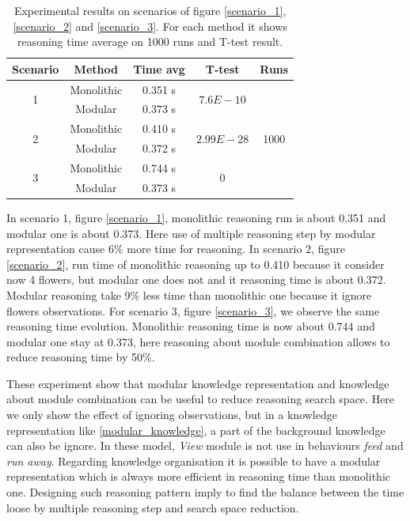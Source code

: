 \documentclass{aamas2012}
\begin{document}
	\begin{table}
		\label{Experiment_tab}
		\centering
		\begin{tabular}{ | c | c | c | c | c | }
		\hline
		Scenario & Method & Time avg & T-test & Runs\\	
		\hline
	 	\multirow{2}{*}{1} & Monolithic & 0.351 s & \multirow{2}{*}{$$7.6E-10$$} & \multirow{6}{*}{1000} \\
		& Modular & 0.373 s & & \\ \cline{1-4}
		\multirow{2}{*}{2} & Monolithic & 0.410 s & \multirow{2}{*}{$$2.99E-28$$} & \\
		& Modular & 0.372 s & & \\ \cline{1-4}
		\multirow{2}{*}{3} & Monolithic & 0.744 s & \multirow{2}{*}{0} &\\
		& Modular & 0.373 s & &\\
		\hline
		\end{tabular}
		\caption
		{
			Experimental results on scenarios of figure \ref{scenario_1}, \ref{scenario_2} and \ref{scenario_3}.
			For each method it shows reasoning time average on 1000 runs and T-test result.
		}
	\end{table}
	
	In scenario 1, figure \ref{scenario_1}, monolithic reasoning run is about 0.351 and modular one is about 0.373.
	Here use of multiple reasoning step by modular representation cause 6\% more time for reasoning.
	In scenario 2, figure \ref{scenario_2}, run time of monolithic reasoning up to 0.410 because it consider now 4 flowers, but
	modular one does not and it reasoning time is about 0.372.
	Modular reasoning take 9\% less time than monolithic one because it ignore flowers observations.
	For scenario 3, figure \ref{scenario_3}, we observe the same reasoning time evolution.
	Monolithic reasoning time is now about 0.744 and modular one stay at 0.373, here reasoning about module combination allows to reduce reasoning time by 50\%.
	
	These experiment show that modular knowledge representation and knowledge about module combination can be useful to reduce reasoning search space.
	Here we only show the effect of ignoring observations, but in a knowledge representation like \ref{modular_knowledge}, a part of the background knowledge can
	also be ignore. In these model, \emph{View} module is not use in behaviours \emph{feed} and \emph{run away}.
	Regarding knowledge organisation it is possible to have a modular representation which is always more efficient in reasoning time than monolithic one.
	Designing such reasoning pattern imply to find the balance between the time loose by multiple reasoning step and search space reduction.
	
\end{document}
